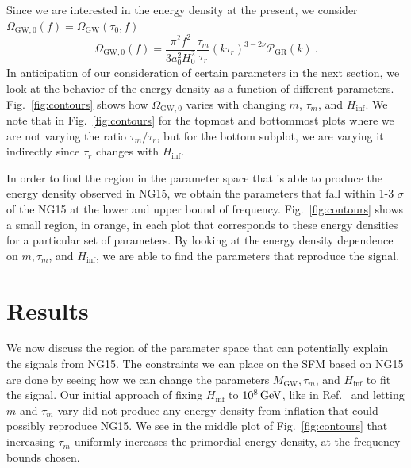 \documentclass[prd,twocolumn,aps,psfig,nofootinbib,nobibnotes,superscriptaddress,preprintnumbers,times]{revtex4-2}
\newcommand{\GeV}{\,{\rm GeV}}
\begin{document}
Since we are interested in the energy density at the present, we consider $\Omega_{\text{GW},0}(f) = \Omega_\text{GW}(\tau_0,f)$
\begin{equation}\label{eqn:om_gw_0}
    \Omega_{\text{GW},0}(f) = \frac{\pi^2f^2}{3a_0^2 H_0^2}\frac{\tau_m}{\tau_r}(k\tau_r)^{3-2\nu}\mathcal{P}_{\text{GR}}(k) \ .
\end{equation}
In anticipation of our consideration of certain parameters in the next section, we look at the behavior of the energy density as a function of different parameters. Fig.\ \ref{fig:contours} shows how $\Omega_{\text{GW},0}$ varies with changing $m$, $\tau_m$, and $H_{\inf}$. We note that in Fig.\ \ref{fig:contours} for the topmost and bottommost plots where we are not varying the ratio $\tau_m/\tau_r$, but for the bottom subplot, we are varying it indirectly since $\tau_r$ changes with $H_{\inf}$.

In order to find the region in the parameter space that is able to produce the energy density observed in NG15, we obtain the parameters that fall within 1-3 $\sigma$ of the NG15 at the lower and upper bound of frequency. Fig.\ \ref{fig:contours} shows a small region, in orange, in each plot that corresponds to these energy densities for a particular set of parameters. By looking at the energy density dependence on $m, \tau_m$, and $H_{\inf}$, we are able to find the parameters that reproduce the signal.


\section{Results}\label{sec:results}
We now discuss the region of the parameter space that can potentially explain the signals from NG15. The constraints we can place on the SFM based on NG15 are done by seeing how we can change the parameters $M_{\text{GW}}, \tau_m$, and $H_{\inf}$ to fit the signal. Our initial approach of fixing $H_{\inf}$ to $10^8 \GeV$, like in Ref.\ \cite{Fujita:2018ehq} and letting $m$ and $\tau_m$ vary did not produce any energy density from inflation that could possibly reproduce NG15. We see in the middle plot of Fig.\ \ref{fig:contours} that increasing $\tau_m$ uniformly increases the primordial energy density, at the frequency bounds chosen. 
\end{document}
